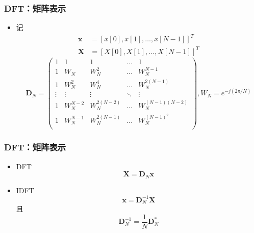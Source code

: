 \documentclass[CJKutf8,xcolor=pdftex,dvipsnames,table]{beamer}
\begin{document}
\begin{CJK*}{UTF8}{song}
  \begin{frame}
    \frametitle{DFT：矩阵表示}
    \begin{itemize}
	\item 记
	\begin{align*}
		\mathbf{x} & =[x[0], x[1], \hdots, x[N-1]]^T \\
		\mathbf{X} & =[X[0], X[1], \hdots, X[N-1]]^T
	\end{align*}
	\[
	\mathbf{D}_N=
    \begin{pmatrix}
1      & 1   & 1     & ... & 1 \\
1      & W_N & W_N^2 & ... & W_N^{N-1} \\
1      & W_N^2 & W_N^4 & ... & W_N^{2(N-1)} \\
\vdots & \vdots & \vdots  & \ddots & \vdots \\
1      & W_N^{N-2} & W_N^{2(N-2)} & ... & W_N^{(N-1)(N-2)} \\
1      & W_N^{N-1} & W_N^{2(N-1)} & ... & W_N^{(N-1)^2} \\

	\end{pmatrix}
	, W_N  = e^{-j(2\pi/N)}
	\]	
	\end{itemize}
  \end{frame} 	
  	
  \begin{frame}
    \frametitle{DFT：矩阵表示}
    \begin{itemize}
	\item DFT
	\[
		\mathbf{X}=\mathbf{D}_N \mathbf{x}
	\]
	\item IDFT
	\[
		\mathbf{x}=\mathbf{D}_N^{-1} \mathbf{X}
	\]
	且
	\[
		\mathbf{D}_N^{-1}=\frac{1}{N}\mathbf{D}_N^{*}
	\]
	\end{itemize}
  \end{frame} 
  	

\end{CJK*}
\end{document}
